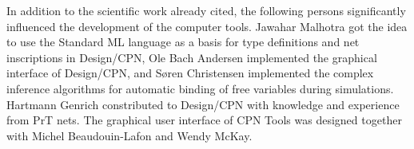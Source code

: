 In addition to the scientific work already cited, the following
persons significantly influenced the development of the computer
tools. Jawahar Malhotra got the idea to use the Standard ML language
as a basis for type definitions and net inscriptions in Design/CPN,
Ole Bach Andersen implemented the graphical interface of Design/CPN,
and S\o{}ren Christensen implemented the complex inference algorithms
for automatic binding of free variables during simulations. Hartmann
Genrich constributed to Design/CPN with knowledge and experience from
PrT nets. The graphical user interface of CPN Tools was designed
together with Michel Beaudouin-Lafon and Wendy McKay.






